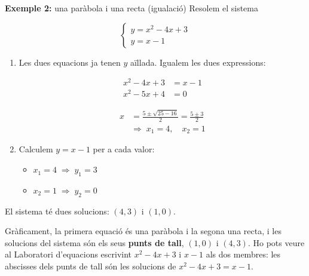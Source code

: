 \begin{exemple}{\textbf{Exemple 2:} una paràbola i una recta (igualació)}
Resolem el sistema

\[
\begin{cases}
y=x^2-4x+3\\
y=x-1
\end{cases}
\]

\begin{enumerate}
\item Les dues equacions ja tenen $y$ aïllada. Igualem les dues expressions:

\[
\begin{aligned}
x^2-4x+3&=x-1\\
x^2-5x+4&=0
\end{aligned}
\]

\[
\begin{aligned}x&=\frac{5\pm\sqrt{25-16}}{2}=\frac{5\pm 3}{2}\\ &\Rightarrow\; x_1=4,\quad x_2=1\end{aligned}
\]
\item Calculem $y=x-1$ per a cada valor:

\begin{itemize}
\item $x_1=4 \;\Rightarrow\; y_1=3$
\item $x_2=1 \;\Rightarrow\; y_2=0$
\end{itemize}
\end{enumerate}

El sistema té dues solucions: $(4,3)$ i $(1,0)$.

Gràficament, la primera equació és una paràbola i la segona una recta, i les solucions del sistema són els seus \textbf{punts de tall}, $(1,0)$ i $(4,3)$. Ho pots veure al Laboratori d'equacions escrivint $x^2-4x+3$ i $x-1$ als dos membres: les abscisses dels punts de tall són les solucions de $x^2-4x+3=x-1$.
\end{exemple}

